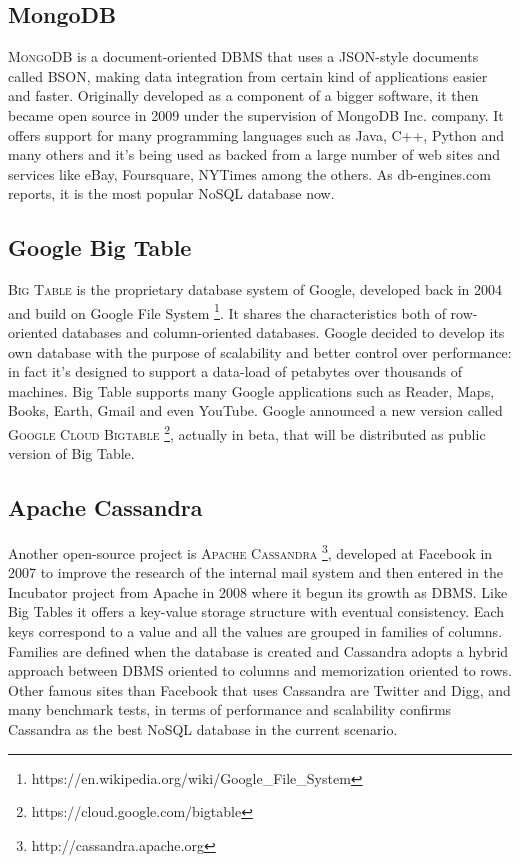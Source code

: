\subsection{MongoDB}
\textsc{MongoDB} is a document-oriented DBMS that uses a JSON-style documents called BSON, making data integration from certain kind of applications easier and faster.
Originally developed as a component of a bigger software, it then became open source in 2009 under the supervision of MongoDB Inc. company.
It offers support for many programming languages such as Java, C++, Python and many others and it’s being used as backed from a large number of web sites and services like eBay, Foursquare, NYTimes among the others.
As db-engines.com reports, it is the most popular NoSQL database now.


\subsection{Google Big Table}
\textsc{Big Table} is the proprietary database system of Google, developed back in 2004 and build on Google File System \footnote{https://en.wikipedia.org/wiki/Google\_File\_System}. It shares the characteristics both of row-oriented databases and column-oriented databases. Google decided to develop its own database with the purpose of scalability and better control over performance: in fact it’s designed to support a data-load of petabytes over thousands of machines.
Big Table supports many Google applications such as Reader, Maps, Books, Earth, Gmail and even YouTube.
Google announced a new version called \textsc{Google Cloud Bigtable }\footnote{https://cloud.google.com/bigtable}, actually in beta, that will be distributed as public version of Big Table.

\subsection{Apache Cassandra}
Another open-source project is \textsc{Apache Cassandra} \footnote{http://cassandra.apache.org}, developed at Facebook in 2007 to improve the research of the internal mail system and then entered in the Incubator project from Apache in 2008 where it begun its growth as DBMS.
Like Big Tables it offers a key-value storage structure with eventual consistency. Each keys correspond to a value and all the values are grouped in families of columns. Families are defined when the database is created and Cassandra adopts a hybrid approach between DBMS oriented to columns and memorization oriented to rows.
Other famous sites than Facebook that uses Cassandra are Twitter and Digg, and many benchmark tests, in terms of performance and scalability confirms Cassandra as the best NoSQL database in the current scenario.

